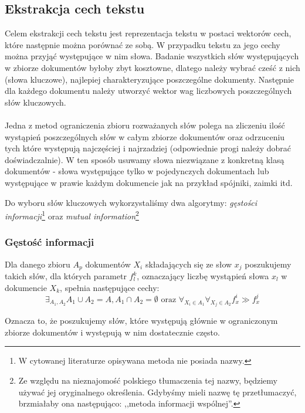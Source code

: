 \documentclass{classrep}
\begin{document}
\subsection{Ekstrakcja cech tekstu}
Celem ekstrakcji cech tekstu jest reprezentacja tekstu w postaci wektorów cech, które następnie można porównać ze sobą. W przypadku tekstu za jego cechy można przyjąć występujące w nim słowa. Badanie wszystkich słów występujących w zbiorze dokumentów byłoby zbyt kosztowne, dlatego należy wybrać cześć z nich (słowa kluczowe), najlepiej charakteryzujące poszczególne dokumenty. Następnie dla każdego dokumentu należy utworzyć wektor wag liczbowych poszczególnych słów kluczowych.

\paragraph{}
Jedna z metod ograniczenia zbioru rozważanych słów polega na zliczeniu ilość wystąpień poszczególnych słów w całym zbiorze dokumentów oraz odrzuceniu tych które występują najczęściej i najrzadziej (odpowiednie progi należy dobrać doświadczalnie). W ten sposób usuwamy słowa niezwiązane z konkretną klasą dokumentów - słowa występujące tylko w pojedynczych dokumentach lub występujące w prawie każdym dokumencie jak na przykład spójniki, zaimki itd.

Do wyboru słów kluczowych wykorzystaliśmy dwa algorytmy: \textit{gęstości informacji}\footnote{W cytowanej literaturze opisywana metoda nie posiada nazwy.} oraz \textit{mutual information}\footnote{Ze względu na nieznajomość polskiego tłumaczenia tej nazwy, będziemy używać jej oryginalnego określenia. Gdybyśmy mieli nazwę tę przetłumaczyć, brzmiałaby ona następująco: ,,metoda informacji wspólnej''.}

\subsubsection{Gęstość informacji}
Dla danego zbioru $A_p$ dokumentów $X_i$ składających się ze słow $x_j$ poszukujemy takich słów, dla których parametr $f^k_l$, oznaczający liczbę wystąpień słowa $x_l$ w dokumencie $X_k$, spełnia następujące cechy:
\begin{equation}
 \exists_{A_1, A_2} A_1 \cup A_2 = A, A_1 \cap A_2 = \emptyset \mbox{ oraz } \forall_{X_i \in A_1} \forall_{X_j \in A_2} f^i_x \gg f^j_x
\end{equation}

Oznacza to, że poszukujemy słów, które występują głównie w ograniczonym zbiorze dokumentów i występują w nim dostatecznie często.
\end{document}

